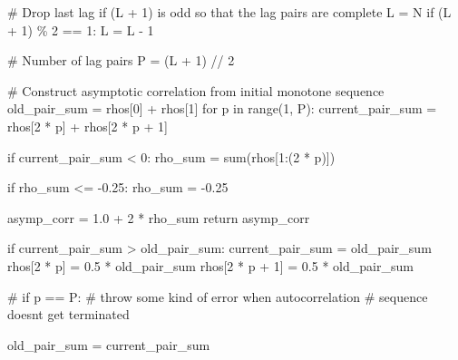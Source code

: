 \documentclass[
  letterpaper,
  DIV=11,
  numbers=noendperiod]{scrartcl}
\newenvironment{Shaded}{\begin{snugshade}}{\end{snugshade}}
\newcommand{\BuiltInTok}[1]{\textcolor[rgb]{0.00,0.23,0.31}{#1}}
\newcommand{\CommentTok}[1]{\textcolor[rgb]{0.37,0.37,0.37}{#1}}
\newcommand{\ControlFlowTok}[1]{\textcolor[rgb]{0.00,0.23,0.31}{#1}}
\newcommand{\DecValTok}[1]{\textcolor[rgb]{0.68,0.00,0.00}{#1}}
\newcommand{\FloatTok}[1]{\textcolor[rgb]{0.68,0.00,0.00}{#1}}
\newcommand{\KeywordTok}[1]{\textcolor[rgb]{0.00,0.23,0.31}{#1}}
\newcommand{\NormalTok}[1]{\textcolor[rgb]{0.00,0.23,0.31}{#1}}
\newcommand{\OperatorTok}[1]{\textcolor[rgb]{0.37,0.37,0.37}{#1}}
\begin{document}
\begin{Shaded}
\begin{Highlighting}[]
  \CommentTok{\# Drop last lag if (L + 1) is odd so that the lag pairs are complete}
\NormalTok{  L }\OperatorTok{=}\NormalTok{ N}
  \ControlFlowTok{if}\NormalTok{ (L }\OperatorTok{+} \DecValTok{1}\NormalTok{) }\OperatorTok{\%} \DecValTok{2} \OperatorTok{==} \DecValTok{1}\NormalTok{:}
\NormalTok{    L }\OperatorTok{=}\NormalTok{ L }\OperatorTok{{-}} \DecValTok{1}

  \CommentTok{\# Number of lag pairs}
\NormalTok{  P }\OperatorTok{=}\NormalTok{ (L }\OperatorTok{+} \DecValTok{1}\NormalTok{) }\OperatorTok{//} \DecValTok{2}

  \CommentTok{\# Construct asymptotic correlation from initial monotone sequence}
\NormalTok{  old\_pair\_sum }\OperatorTok{=}\NormalTok{ rhos[}\DecValTok{0}\NormalTok{] }\OperatorTok{+}\NormalTok{ rhos[}\DecValTok{1}\NormalTok{]}
  \ControlFlowTok{for}\NormalTok{ p }\KeywordTok{in} \BuiltInTok{range}\NormalTok{(}\DecValTok{1}\NormalTok{, P):}
\NormalTok{    current\_pair\_sum }\OperatorTok{=}\NormalTok{ rhos[}\DecValTok{2} \OperatorTok{*}\NormalTok{ p] }\OperatorTok{+}\NormalTok{ rhos[}\DecValTok{2} \OperatorTok{*}\NormalTok{ p }\OperatorTok{+} \DecValTok{1}\NormalTok{]}

    \ControlFlowTok{if}\NormalTok{ current\_pair\_sum }\OperatorTok{\textless{}} \DecValTok{0}\NormalTok{:}
\NormalTok{      rho\_sum }\OperatorTok{=} \BuiltInTok{sum}\NormalTok{(rhos[}\DecValTok{1}\NormalTok{:(}\DecValTok{2} \OperatorTok{*}\NormalTok{ p)])}

      \ControlFlowTok{if}\NormalTok{ rho\_sum }\OperatorTok{\textless{}=} \OperatorTok{{-}}\FloatTok{0.25}\NormalTok{:}
\NormalTok{        rho\_sum }\OperatorTok{=} \OperatorTok{{-}}\FloatTok{0.25}

\NormalTok{      asymp\_corr }\OperatorTok{=} \FloatTok{1.0} \OperatorTok{+} \DecValTok{2} \OperatorTok{*}\NormalTok{ rho\_sum}
      \ControlFlowTok{return}\NormalTok{ asymp\_corr}

    \ControlFlowTok{if}\NormalTok{ current\_pair\_sum }\OperatorTok{\textgreater{}}\NormalTok{ old\_pair\_sum:}
\NormalTok{      current\_pair\_sum }\OperatorTok{=}\NormalTok{ old\_pair\_sum}
\NormalTok{      rhos[}\DecValTok{2} \OperatorTok{*}\NormalTok{ p]     }\OperatorTok{=} \FloatTok{0.5} \OperatorTok{*}\NormalTok{ old\_pair\_sum}
\NormalTok{      rhos[}\DecValTok{2} \OperatorTok{*}\NormalTok{ p }\OperatorTok{+} \DecValTok{1}\NormalTok{] }\OperatorTok{=} \FloatTok{0.5} \OperatorTok{*}\NormalTok{ old\_pair\_sum}

    \CommentTok{\# if p == P:}
      \CommentTok{\# throw some kind of error when autocorrelation}
      \CommentTok{\# sequence doesn\textquotesingle{}t get terminated}

\NormalTok{    old\_pair\_sum }\OperatorTok{=}\NormalTok{ current\_pair\_sum}

\end{Highlighting}
\end{Shaded}
\end{document}
